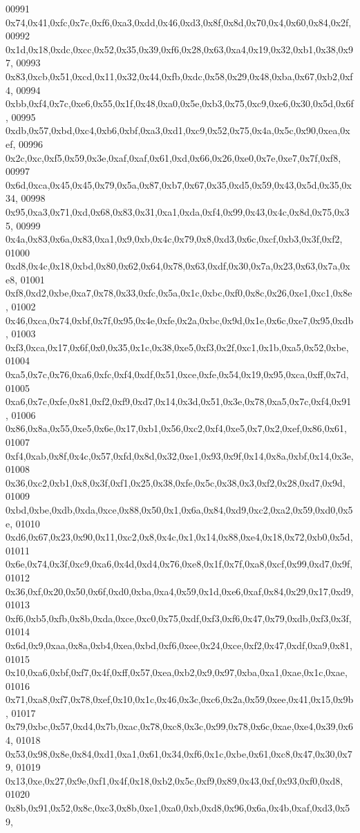 \begin{DoxyCode}
00991   0x74,0x41,0xfc,0x7c,0xf6,0xa3,0xdd,0x46,0xd3,0x8f,0x8d,0x70,0x4,0x60,0x84,0x2f,
00992   0x1d,0x18,0xdc,0xcc,0x52,0x35,0x39,0xf6,0x28,0x63,0xa4,0x19,0x32,0xb1,0x38,0x97,
00993   0x83,0xcb,0x51,0xcd,0x11,0x32,0x44,0xfb,0xdc,0x58,0x29,0x48,0xba,0x67,0xb2,0xf4,
00994   0xbb,0xf4,0x7c,0xe6,0x55,0x1f,0x48,0xa0,0x5e,0xb3,0x75,0xc9,0xe6,0x30,0x5d,0x6f,
00995   0xdb,0x57,0xbd,0xc4,0xb6,0xbf,0xa3,0xd1,0xc9,0x52,0x75,0x4a,0x5c,0x90,0xea,0xef,
00996   0x2c,0xc,0xf5,0x59,0x3e,0xaf,0xaf,0x61,0xd,0x66,0x26,0xe0,0x7e,0xe7,0x7f,0xf8,
00997   0x6d,0xca,0x45,0x45,0x79,0x5a,0x87,0xb7,0x67,0x35,0xd5,0x59,0x43,0x5d,0x35,0x34,
00998   0x95,0xa3,0x71,0xd,0x68,0x83,0x31,0xa1,0xda,0xf4,0x99,0x43,0x4c,0x8d,0x75,0x35,
00999   0x4a,0x83,0x6a,0x83,0xa1,0x9,0xb,0x4c,0x79,0x8,0xd3,0x6c,0xcf,0xb3,0x3f,0xf2,
01000   0xd8,0x4c,0x18,0xbd,0x80,0x62,0x64,0x78,0x63,0xdf,0x30,0x7a,0x23,0x63,0x7a,0xe8,
01001   0xf8,0xd2,0xbe,0xa7,0x78,0x33,0xfc,0x5a,0x1c,0xbc,0xf0,0x8c,0x26,0xe1,0xc1,0x8e,
01002   0x46,0xca,0x74,0xbf,0x7f,0x95,0x4e,0xfe,0x2a,0xbc,0x9d,0x1e,0x6c,0xe7,0x95,0xdb,
01003   0xf3,0xca,0x17,0x6f,0x0,0x35,0x1c,0x38,0xe5,0xf3,0x2f,0xc1,0x1b,0xa5,0x52,0xbe,
01004   0xa5,0x7c,0x76,0xa6,0xfc,0xf4,0xdf,0x51,0xce,0xfe,0x54,0x19,0x95,0xca,0xff,0x7d,
01005   0xa6,0x7c,0xfe,0x81,0xf2,0xf9,0xd7,0x14,0x3d,0x51,0x3e,0x78,0xa5,0x7c,0xf4,0x91,
01006   0x86,0x8a,0x55,0xe5,0x6e,0x17,0xb1,0x56,0xc2,0xf4,0xe5,0x7,0x2,0xef,0x86,0x61,
01007   0xf4,0xab,0x8f,0x4c,0x57,0xfd,0x8d,0x32,0xe1,0x93,0x9f,0x14,0x8a,0xbf,0x14,0x3e,
01008   0x36,0xc2,0xb1,0x8,0x3f,0xf1,0x25,0x38,0xfe,0x5c,0x38,0x3,0xf2,0x28,0xd7,0x9d,
01009   0xbd,0xbe,0xdb,0xda,0xce,0x88,0x50,0x1,0x6a,0x84,0xd9,0xc2,0xa2,0x59,0xd0,0x5e,
01010   0xd6,0x67,0x23,0x90,0x11,0xc2,0x8,0x4c,0x1,0x14,0x88,0xe4,0x18,0x72,0xb0,0x5d,
01011   0x6e,0x74,0x3f,0xc9,0xa6,0x4d,0xd4,0x76,0xe8,0x1f,0x7f,0xa8,0xcf,0x99,0xd7,0x9f,
01012   0x36,0xf,0x20,0x50,0x6f,0xd0,0xba,0xa4,0x59,0x1d,0xe6,0xaf,0x84,0x29,0x17,0xd9,
01013   0xf6,0xb5,0xfb,0x8b,0xda,0xce,0xc0,0x75,0xdf,0xf3,0xf6,0x47,0x79,0xdb,0xf3,0x3f,
01014   0x6d,0x9,0xaa,0x8a,0xb4,0xea,0xbd,0xf6,0xee,0x24,0xce,0xf2,0x47,0xdf,0xa9,0x81,
01015   0x10,0xa6,0xbf,0xf7,0x4f,0xff,0x57,0xea,0xb2,0x9,0x97,0xba,0xa1,0xae,0x1c,0xae,
01016   0x71,0xa8,0xf7,0x78,0xef,0x10,0x1c,0x46,0x3c,0xc6,0x2a,0x59,0xee,0x41,0x15,0x9b,
01017   0x79,0xbc,0x57,0xd4,0x7b,0xac,0x78,0xc8,0x3c,0x99,0x78,0x6c,0xae,0xe4,0x39,0x64,
01018   0x53,0x98,0x8e,0x84,0xd1,0xa1,0x61,0x34,0xf6,0x1c,0xbe,0x61,0xc8,0x47,0x30,0x79,
01019   0x13,0xe,0x27,0x9e,0xf1,0x4f,0x18,0xb2,0x5c,0xf9,0x89,0x43,0xf,0x93,0xf0,0xd8,
01020   0x8b,0x91,0x52,0x8c,0xc3,0x8b,0xe1,0xa0,0xb,0xd8,0x96,0x6a,0x4b,0xaf,0xd3,0x59,

\end{DoxyCode}
